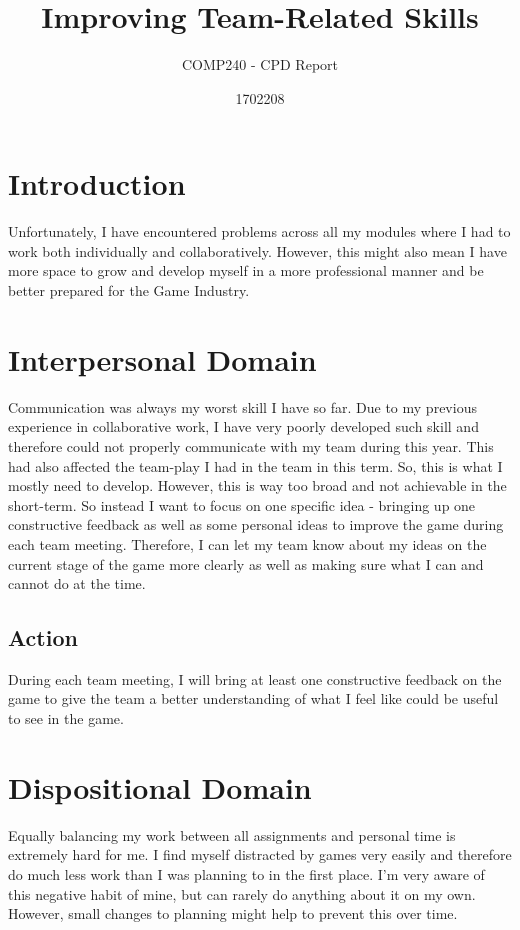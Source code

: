 \documentclass{scrartcl}
\title{Improving Team-Related Skills}
\subtitle{COMP240 - CPD Report}
\author{1702208}
\begin{document}
\maketitle

\section{Introduction}
Unfortunately, I have encountered problems across all my modules where I had to work both individually and collaboratively. However, this might also mean I have more space to grow and develop myself in a more professional manner and be better prepared for the Game Industry.

\section{Interpersonal Domain}
Communication was always my worst skill I have so far. Due to my previous experience in collaborative work, I have very poorly developed such skill and therefore could not properly communicate with my team during this year. This had also affected the team-play I had in the team in this term. So, this is what I mostly need to develop. However, this is way too broad and not achievable in the short-term. So instead I want to focus on one specific idea - bringing up one constructive feedback as well as some personal ideas to improve the game during each team meeting. Therefore, I can let my team know about my ideas on the current stage of the game more clearly as well as making sure what I can and cannot do at the time.

\subsection{Action}
During each team meeting, I will bring at least one constructive feedback on the game to give the team a better understanding of what I feel like could be useful to see in the game.

\section{Dispositional Domain}
Equally balancing my work between all assignments and personal time is extremely hard for me. I find myself distracted by games very easily and therefore do much less work than I was planning to in the first place. I'm very aware of this negative habit of mine, but can rarely do anything about it on my own. However, small changes to planning might help to prevent this over time. 
\end{document}
